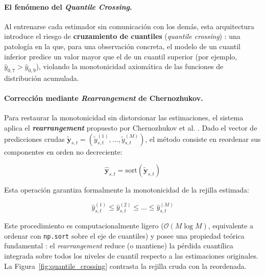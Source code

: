 \paragraph{El fenómeno del \textit{Quantile Crossing}.}
Al entrenarse cada estimador sin comunicación con los demás, esta arquitectura introduce el riesgo de \textbf{cruzamiento de cuantiles} (\textit{quantile crossing}) \cite{koenker2005quantile}: una patología en la que, para una observación concreta, el modelo de un cuantil inferior predice un valor mayor que el de un cuantil superior (por ejemplo, $\hat{y}_{0{,}7} > \hat{y}_{0{,}9}$), violando la monotonicidad axiomática de las funciones de distribución acumulada.

\paragraph{Corrección mediante \textit{Rearrangement} de Chernozhukov.}
Para restaurar la monotonicidad sin distorsionar las estimaciones, el sistema aplica el \textbf{\textit{rearrangement}} propuesto por Chernozhukov et al. \cite{chernozhukov2010quantile}. Dado el vector de predicciones crudas $\tilde{\mathbf{y}}_{s,t} = (\tilde{y}_{s,t}^{(1)}, \dots, \tilde{y}_{s,t}^{(M)})$, el método consiste en reordenar sus componentes en orden no decreciente:

\begin{equation}
    \hat{\mathbf{y}}_{s,t} = \text{sort}\!\left(\tilde{\mathbf{y}}_{s,t}\right)
\end{equation}

Esta operación garantiza formalmente la monotonicidad de la rejilla estimada:

\begin{equation}
    \hat{y}_{s,t}^{(1)} \le \hat{y}_{s,t}^{(2)} \le \dots \le \hat{y}_{s,t}^{(M)}
\end{equation}

Este procedimiento es computacionalmente ligero ($\mathcal{O}(M \log M)$, equivalente a ordenar con \texttt{np.sort} sobre el eje de cuantiles) y posee una propiedad teórica fundamental \cite{chernozhukov2010quantile}: el \textit{rearrangement} reduce (o mantiene) la pérdida cuantílica integrada sobre todos los niveles de cuantil respecto a las estimaciones originales. La Figura~\ref{fig:quantile_crossing} contrasta la rejilla cruda con la reordenada.


